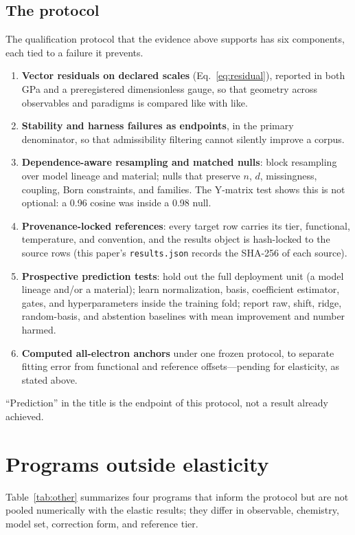 \documentclass[11pt]{article}
\newcommand{\code}[1]{\texttt{#1}}
\begin{document}
\subsection{The protocol}

The qualification protocol that the evidence above supports has six components, each tied to a failure it prevents.
\begin{enumerate}
\item \textbf{Vector residuals on declared scales} (Eq.~\ref{eq:residual}), reported in both GPa and a preregistered dimensionless gauge, so that geometry across observables and paradigms is compared like with like.
\item \textbf{Stability and harness failures as endpoints}, in the primary denominator, so that admissibility filtering cannot silently improve a corpus.
\item \textbf{Dependence-aware resampling and matched nulls}: block resampling over model lineage and material; nulls that preserve $n$, $d$, missingness, coupling, Born constraints, and families. The Y-matrix test shows this is not optional: a 0.96 cosine was inside a 0.98 null.
\item \textbf{Provenance-locked references}: every target row carries its tier, functional, temperature, and convention, and the results object is hash-locked to the source rows (this paper's \code{results.json} records the SHA-256 of each source).
\item \textbf{Prospective prediction tests}: hold out the full deployment unit (a model lineage and/or a material); learn normalization, basis, coefficient estimator, gates, and hyperparameters inside the training fold; report raw, shift, ridge, random-basis, and abstention baselines with mean improvement and number harmed.
\item \textbf{Computed all-electron anchors} under one frozen protocol, to separate fitting error from functional and reference offsets---pending for elasticity, as stated above.
\end{enumerate}
``Prediction'' in the title is the endpoint of this protocol, not a result already achieved.

\section{Programs outside elasticity}
\label{sec:other}

Table~\ref{tab:other} summarizes four programs that inform the protocol but are not pooled numerically with the elastic results; they differ in observable, chemistry, model set, correction form, and reference tier.
\end{document}

